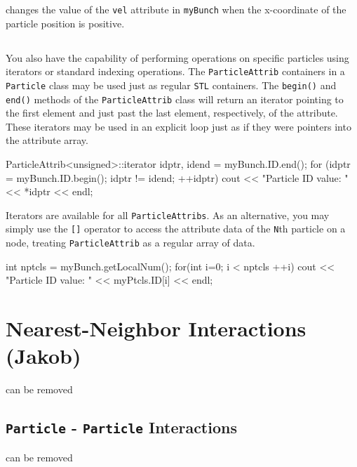 changes the value of the \texttt{vel} attribute in \texttt{myBunch} when the x-coordinate of the particle position is positive.

\subsection{}

You also have the capability of performing operations on specific particles using iterators or standard indexing operations. The \texttt{ParticleAttrib} containers in a \texttt{Particle} class may be used just as regular \texttt{STL} containers. The \texttt{begin()} and \texttt{end()} methods of the \texttt{ParticleAttrib} class will return an iterator pointing to the first element and just past the last element, respectively, of the attribute. These iterators may be used in an explicit loop just as if they were pointers into the attribute array.
\begin{smallcode}
ParticleAttrib<unsigned>::iterator idptr, idend = myBunch.ID.end();
for (idptr = myBunch.ID.begin(); idptr != idend; ++idptr)
    cout << "Particle ID value: " << *idptr << endl;
\end{smallcode}


Iterators are available for all \texttt{ParticleAttribs}. As an alternative, you may simply use the \texttt{[]} operator to access the attribute data of the \texttt{N}th particle on a node, treating \texttt{ParticleAttrib} as a regular array of data.
\begin{smallcode}
int nptcls = myBunch.getLocalNum();
for(int i=0; i < nptcls ++i) {
    cout << "Particle ID value: " << myPtcls.ID[i] << endl;
}
\end{smallcode}


\section{{\color{red}Nearest-Neighbor Interactions (Jakob)}}
{\color{red} can be removed}


\subsection{{\color{red}\texttt{Particle} - \texttt{Particle} Interactions}}
{\color{red} can be removed}

\subsection{}

